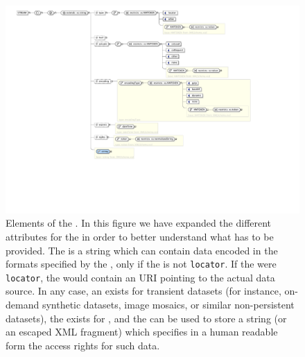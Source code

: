 \begin{figure}[tbp]
	\centering
		\includegraphics[width=\columnwidth]{fig/VOTableStream.pdf}
	\caption[Elements of the ]
	{
		Elements of the . In this figure we have
		expanded the different attributes for the 
		in order to better understand what has to be provided. The
		 is a string which can contain data encoded
		in the formats specified by the , only if
		the  is not \texttt{locator}. If the
		 were \texttt{locator}, the 
		would contain an URI pointing to the actual data source. In
		any case, an  exists for transient
		datasets (for instance, on-demand synthetic datasets, image
		mosaics, or similar non-persistent datasets), the
		 exists for , and the 
		can be used to store a string (or an escaped XML fragment)
		which specifies in a human readable form the access rights
		for such data. \oxygenxml
	}
	\label{fig:fig_VOTableStream}
\end{figure}



